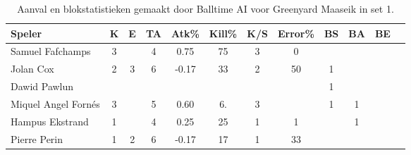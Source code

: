 \begin{table}[ht!]
  \centering
  \scriptsize
  \begin{tabular}{|l|c|c|c|c|c|c|c|c|c|c|c|} \hline
    \textbf{Speler} & K & E & TA & Atk\% & Kill\% & K/S & Error\% & BS & BA & BE \\ \hline
    Samuel Fafchamps & 3 &  & 4 & 0.75 & 75 & 3 & 0 &  &  & \\
    Jolan Cox & 2 & 3 & 6 & -0.17 & 33 & 2 & 50 & 1 &  &  \\
    Dawid Pawlun &   &   &   &   &   &   &   & 1 &  &   \\
    Miquel Angel Fornés & 3 &  & 5 & 0.60 & 6. & 3 &  & 1 & 1 & \\
    Hampus Ekstrand & 1 &  & 4 & 0.25 & 25 & 1 & 1 &  & 1 & \\
    Pierre Perin & 1 & 2 & 6 & -0.17 & 17 & 1 & 33 &  &   &  \\ \hline
    \end{tabular}
  \caption[Aanvals- en blokstatistieken gemaakt door Balltime AI voor Greenyard Maaseik in set 1]{\label{tab:PL1AttBlockMaaseik1}Aanval en blokstatistieken gemaakt door Balltime AI voor Greenyard Maaseik in set 1.}
\end{table}
